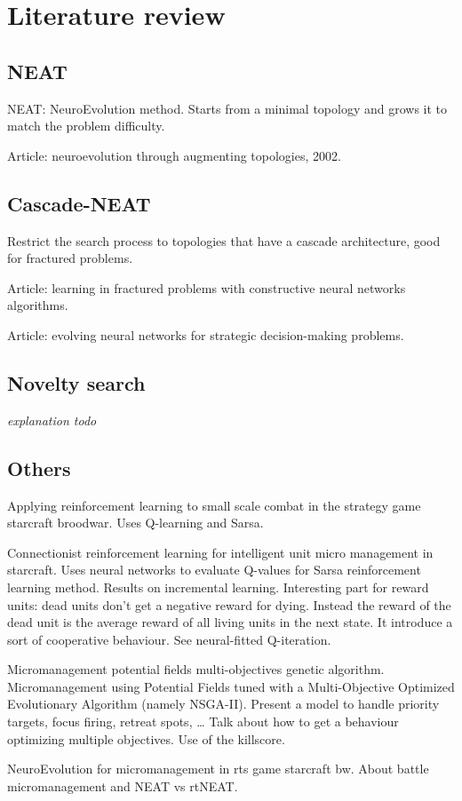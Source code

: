 \section{Literature review}\label{section:literature-review}

\subsection{NEAT}

NEAT: NeuroEvolution method. Starts from a minimal topology and grows it to match the problem difficulty.

Article: neuroevolution through augmenting topologies, 2002.

\subsection{Cascade-NEAT}

Restrict the search process to topologies that have a cascade architecture, good for fractured problems.

Article: learning in fractured problems with constructive neural networks algorithms.

Article: evolving neural networks for strategic decision-making problems.

\subsection{Novelty search}

\emph{explanation todo} \citet{LeSt11}

\subsection{Others}

Applying reinforcement learning to small scale combat in the strategy game starcraft broodwar. Uses Q-learning and Sarsa.

Connectionist reinforcement learning for intelligent unit micro management in starcraft. Uses neural networks to evaluate Q-values for Sarsa reinforcement learning method. Results on incremental learning. Interesting part for reward units: dead units don’t get a negative reward for dying. Instead the reward of the dead unit is the average reward of all living units in the next state. It introduce a sort of cooperative behaviour. See neural-fitted Q-iteration.

Micromanagement potential fields multi-objectives genetic algorithm. Micromanagement using Potential Fields tuned with a Multi-Objective Optimized Evolutionary Algorithm (namely NSGA-II). Present a model to handle priority targets, focus firing, retreat spots, … Talk about how to get a behaviour optimizing multiple objectives. Use of the killscore.

NeuroEvolution for micromanagement in rts game starcraft bw. About battle micromanagement and NEAT vs rtNEAT.


